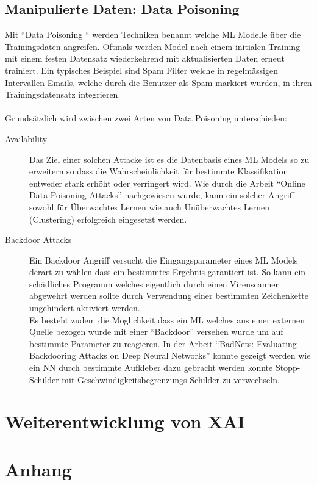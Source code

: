 \documentclass[
  12pt, %
  a4paper, %
  oneside, %
  openany, 
  numbers=noenddot, %
  BCOR=5mm, %
  parskip=half*, %
  thesis, %
]{bfhbook}
\begin{document}
\section{Manipulierte Daten: Data Poisoning}
\label{dataP}
Mit ``Data Poisoning `` werden Techniken benannt welche \Gls{ML} Modelle über die Trainingsdaten angreifen. Oftmals werden Model nach einem initialen Training mit einem festen Datensatz wiederkehrend mit aktualisierten Daten erneut trainiert. Ein typisches Beispiel sind Spam Filter welche in regelmässigen Intervallen Emails, welche durch die Benutzer als Spam markiert wurden, in ihren Trainingsdatensatz integrieren.
 \\\\
Grundsätzlich wird zwischen zwei Arten von Data Poisoning unterschieden:
\begin{description}
  		\item[Availability] Das Ziel einer solchen Attacke ist es die Datenbasis eines \Gls{ML} Models so zu erweitern so dass die Wahrscheinlichkeit für bestimmte Klassifikation entweder stark erhöht oder verringert wird. Wie durch die Arbeit ``Online Data Poisoning Attacks'' \parencite{Zhang2019} nachgewiesen wurde, kann ein solcher Angriff sowohl für Überwachtes Lernen wie auch Unüberwachtes Lernen (Clustering) erfolgreich eingesetzt werden. 
  		\item[Backdoor Attacks] Ein Backdoor Angriff versucht die Eingangsparameter eines \Gls{ML} Models derart zu wählen dass ein bestimmtes Ergebnis garantiert ist. So kann ein schädliches Programm welches eigentlich durch einen Virenscanner abgewehrt werden sollte durch Verwendung einer bestimmten Zeichenkette ungehindert aktiviert werden.\\
  		Es besteht zudem die Möglichkeit dass ein \Gls{ML} welches aus einer externen Quelle bezogen wurde mit einer ``Backdoor'' versehen wurde um auf bestimmte Parameter zu reagieren. In der Arbeit ``BadNets: Evaluating Backdooring Attacks
on Deep Neural Networks'' \parencite{Gu2019} konnte gezeigt werden wie ein \Gls{NN} durch bestimmte Aufkleber dazu gebracht werden konnte Stopp-Schilder mit Geschwindigkeitsbegrenzungs-Schilder zu verwechseln.
	\end{description}

\chapter{Weiterentwicklung von XAI}

\chapter{Anhang}
\end{document}
